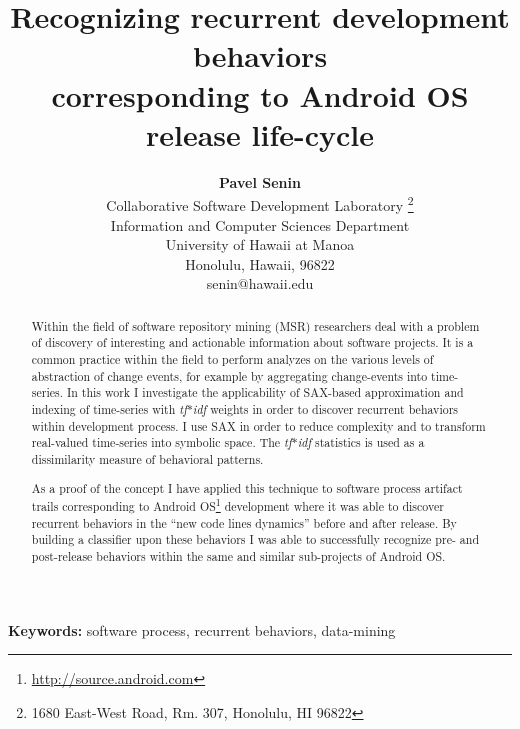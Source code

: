 \documentclass[conference]{worldcomp}
\title{\bf Recognizing recurrent development behaviors\\ corresponding to Android OS release life-cycle}           %
\author{
{\bfseries Pavel Senin}\\
Collaborative Software Development Laboratory \thanks{1680 East-West Road, Rm. 307, Honolulu, HI 96822}\\
Information and Computer Sciences Department\\
University of Hawaii at Manoa\\
Honolulu, Hawaii, 96822\\
senin@hawaii.edu}
\begin{document}
\maketitle                        %

\begin{abstract}
Within the field of software repository mining (MSR) researchers deal with a problem 
of discovery of interesting and actionable information about software projects.
It is a common practice within the field to perform analyzes on the various 
levels of abstraction of change events, for example by aggregating change-events 
into time-series.
In this work I investigate the applicability of SAX-based approximation and 
indexing of time-series with \textit{tf$\ast$idf} weights in order to discover recurrent 
behaviors within development process. 
I use SAX in order to reduce complexity and to transform real-valued time-series 
into symbolic space. The \textit{tf$\ast$idf} statistics is used as a dissimilarity measure 
of behavioral patterns.

As a proof of the concept I have applied this technique to software process artifact trails 
corresponding to Android OS\footnote[1]{\url{http://source.android.com}} development where
it was able to discover recurrent behaviors in the ``new code lines dynamics'' before 
and after release. By building a classifier upon these behaviors I was able to successfully 
recognize pre- and post-release behaviors within the same and similar sub-projects of Android OS.
\end{abstract}

\vspace{1em}
\noindent\textbf{Keywords:}
 {\small  software process, recurrent behaviors, data-mining} %

%
\end{document}
